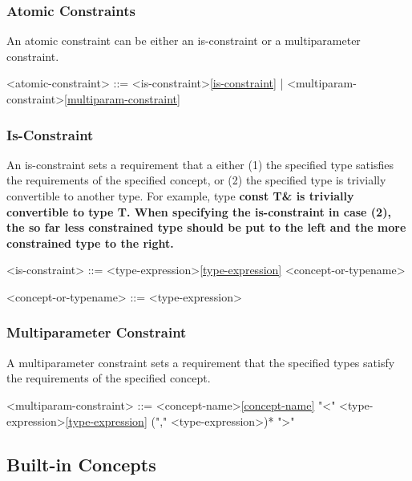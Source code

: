 \documentclass[a4paper,oneside,11pt]{article}
\begin{document}
\subsubsection{Atomic Constraints}

An atomic constraint can be either an is-constraint or a multiparameter constraint.

\begin{grammar}
\label{atomic-constraint}<atomic-constraint> ::= <is-constraint>\ref{is-constraint} | <multiparam-constraint>\ref{multiparam-constraint}
\end{grammar}

\subsubsection{Is-Constraint}

An is-constraint sets a requirement that a either (1) the specified type satisfies the requirements of the specified concept, or (2) the specified type is trivially convertible to another type. For example, type \bf{const T\&} is trivially convertible to type \bf{T}.
When specifying the is-constraint in case (2), the so far less constrained type should be put to the left and the more constrained type to the right.

\begin{grammar}
\label{is-constraint}<is-constraint> ::= <type-expression>\ref{type-expression}  <concept-or-typename>

<concept-or-typename> ::= <type-expression>
\end{grammar}

\subsubsection{Multiparameter Constraint}

A multiparameter constraint sets a requirement that the specified types satisfy the requirements of the specified concept.

\begin{grammar}
\label{multiparam-constraint}<multiparam-constraint> ::= <concept-name>\ref{concept-name} "<" <type-expression>\ref{type-expression} ("," <type-expression>)* ">"
\end{grammar}

\subsection{Built-in Concepts}
\end{document}
